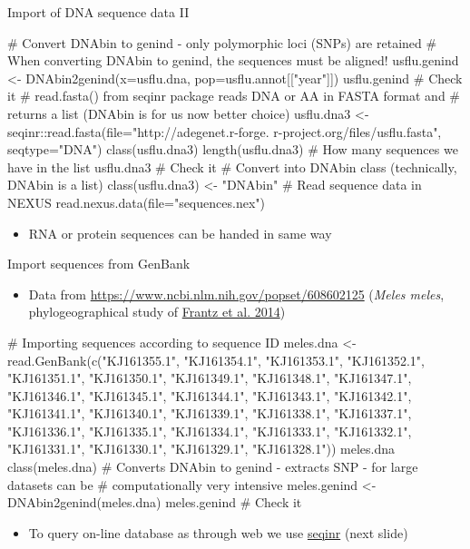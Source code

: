 \documentclass[compress, ucs, xelatex, 11pt, xcolor=svgnames,
  hyperref={
    bookmarks=true,
    unicode=true,
    colorlinks=true,
    pdftitle={Molecular data in R},
    plainpages=false,
    pdfauthor={Vojtech Zeisek},
    pdfsubject={Course about phylogeny and evolution in R},
    pdfcreator={XeLaTeX},
    pdfkeywords={R, evolution, phylogeny, molecular data},
    linkcolor=Tomato,
    anchorcolor=SaddleBrown,
    citecolor=Goldenrod,
    filecolor=DarkMagenta,
    menucolor=Sienna,
    urlcolor=DarkTurquoise,
    pdftex},
  url={hyphens, lowtilde} %
  ]{beamer}
\begin{document}
\begin{frame}[fragile]{Import of DNA sequence data II}
  \begin{spluscode}
    # Convert DNAbin to genind - only polymorphic loci (SNPs) are retained
    # When converting DNAbin to genind, the sequences must be aligned!
    usflu.genind <- DNAbin2genind(x=usflu.dna, pop=usflu.annot[["year"]])
    usflu.genind # Check it
    # read.fasta() from seqinr package reads DNA or AA in FASTA format and
    # returns a list (DNAbin is for us now better choice)
    usflu.dna3 <- seqinr::read.fasta(file="http://adegenet.r-forge.
      r-project.org/files/usflu.fasta", seqtype="DNA")
    class(usflu.dna3)
    length(usflu.dna3) # How many sequences we have in the list
    usflu.dna3 # Check it
    # Convert into DNAbin class (technically, DNAbin is a list)
    class(usflu.dna3) <- "DNAbin"
    # Read sequence data in NEXUS
    read.nexus.data(file="sequences.nex")
  \end{spluscode}
  \begin{itemize}
    \item RNA or protein sequences can be handed in same way
  \end{itemize}
\end{frame}

\begin{frame}[fragile]{Import sequences from GenBank}
  \begin{itemize}
    \item Data from \url{https://www.ncbi.nlm.nih.gov/popset/608602125} (\textit{Meles meles}, phylogeographical study of \href{https://www.nature.com/articles/hdy201445}{Frantz et al. 2014})
  \end{itemize}
  \begin{spluscode}
    # Importing sequences according to sequence ID
    meles.dna <- read.GenBank(c("KJ161355.1", "KJ161354.1", "KJ161353.1",
      "KJ161352.1", "KJ161351.1", "KJ161350.1", "KJ161349.1", "KJ161348.1",
      "KJ161347.1", "KJ161346.1", "KJ161345.1", "KJ161344.1", "KJ161343.1",
      "KJ161342.1", "KJ161341.1", "KJ161340.1", "KJ161339.1", "KJ161338.1",
      "KJ161337.1", "KJ161336.1", "KJ161335.1", "KJ161334.1", "KJ161333.1",
      "KJ161332.1", "KJ161331.1", "KJ161330.1", "KJ161329.1", "KJ161328.1"))
    meles.dna
    class(meles.dna)
    # Converts DNAbin to genind - extracts SNP - for large datasets can be
    # computationally very intensive
    meles.genind <- DNAbin2genind(meles.dna)
    meles.genind # Check it
  \end{spluscode}
  \begin{itemize}
    \item To query on-line database as through web we use \href{https://CRAN.R-project.org/package=seqinr}{seqinr} (next slide)
  \end{itemize}
\end{frame}
\end{document}
